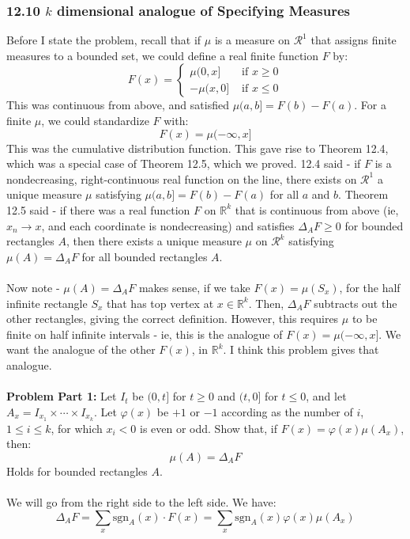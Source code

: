 \documentclass[12pt,a4paper]{article}
\newcommand{\1}[1]{\mathbbm{1}\left\{ #1 \right\}}
\newcommand{\R}{\mathbb{R}}
\newcommand{\rcal}{\mathcal{R}}
\newcommand{\sgn}{\text{sgn}}
\begin{document}
\subsubsection{12.10 $k$ dimensional analogue of Specifying Measures} Before I state the problem, recall that if $\mu$ is a measure on $\rcal^1$ that assigns finite measures to a bounded set, we could define a real finite function $F$ by:
$$
	F(x) = \begin{cases}
	\mu(0,x] & \text{ if $x \geq 0$}\\
	-\mu(x,0] & \text{ if $x \leq 0$}
	\end{cases}
$$
This was continuous from above, and satisfied $\mu(a,b] = F(b) - F(a)$. For a finite $\mu$, we could standardize $F$ with:
$$
	F(x) = \mu(-\infty,x]
$$
This was the cumulative distribution function. This gave rise to Theorem 12.4, which was a special case of Theorem 12.5, which we proved. 12.4 said - if $F$ is a nondecreasing, right-continuous real function on the line, there exists on $\rcal^1$ a unique measure $\mu$ satisfying $\mu(a,b] = F(b) - F(a)$ for all $a$ and $b$. Theorem 12.5 said - if there was a real function $F$ on $\R^k$ that is continuous from above (ie, $x_n \to x$, and each coordinate is nondecreasing) and satisfies $\Delta_AF \geq 0$ for bounded rectangles $A$, then there exists a unique measure $\mu$ on $\rcal^k$ satisfying $\mu(A) = \Delta_AF$ for all bounded rectangles $A$.
\\\\
Now note - $\mu(A) = \Delta_AF$ makes sense, if we take $F(x) = \mu(S_x)$, for the half infinite rectangle $S_x$ that has top vertex at $x \in \R^k$. Then, $\Delta_A F$ subtracts out the other rectangles, giving the correct definition. However, this requires $\mu$ to be finite on half infinite intervals - ie, this is the analogue of $F(x) = \mu(-\infty,x]$. We want the analogue of the other $F(x)$, in $\R^k$. I think this problem gives that analogue.
\\\\
\textbf{Problem Part 1:} Let $I_t$ be $(0,t]$ for $t \geq 0$ and $(t,0]$ for $t \leq 0$, and let $A_x = I_{x_1} \times \cdots \times I_{x_k}$. Let $\varphi(x)$ be $+1$ or $-1$ according as the number of $i$, $1 \leq i \leq k$, for which $x_i < 0$ is even or odd. Show that, if $F(x) = \varphi(x)\mu(A_x)$, then:
$$
	\mu(A) = \Delta_A F
$$
Holds for bounded rectangles $A$.
\\\\
We will go from the right side to the left side. We have:
$$
	\Delta_A F = \sum_x \sgn_A(x) \cdot F(x) =
	\sum_x \sgn_A(x) \varphi(x) \mu(A_x)
$$
\end{document}
